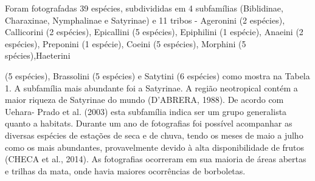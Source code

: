 \documentclass[article,12pt,onesidea,4paper,english,brazil]{abntex2}
\begin{document}
	Foram fotografadas 39 espécies, subdivididas em 4 subfamílias (Biblidinae, Charaxinae, Nymphalinae e Satyrinae) e 11 tribos - Ageronini (2 espécies), Callicorini (2 espécies), Epicallini (5 espécies), Epiphilini (1 espécie), Anaeini (2 espécies), Preponini (1 espécie), Coeini (5 espécies), Morphini (5 spécies),Haeterini
	
	
	(5 espécies), Brassolini (5 espécies) e Satytini (6 espécies) como mostra na Tabela 1.
	A subfamília mais abundante foi a Satyrinae. A região neotropical contém a maior riqueza de Satyrinae do mundo (D’ABRERA, 1988). De acordo com Uehara- Prado et al. (2003) esta subfamília indica ser um grupo generalista quanto a habitats. Durante um ano de fotografias foi possível acompanhar as diversas espécies de estações de seca e de chuva, tendo os meses de maio a julho como os mais abundantes, provavelmente devido à alta disponibilidade de frutos (CHECA et al., 2014). As fotografias ocorreram em sua maioria de áreas abertas e trilhas da mata, onde havia maiores ocorrências de borboletas.
\end{document}
